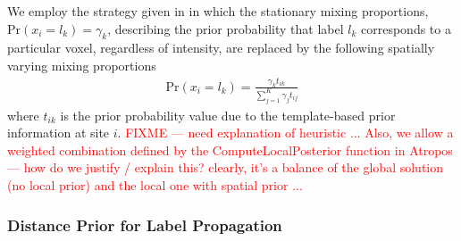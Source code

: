 \documentclass[11pt,english]{article}
\begin{document}
We employ the strategy given in \cite{Ashburner2005} in which the
stationary mixing proportions, $\mathrm{Pr}(x_i = l_k) = \gamma_k$,
describing the prior probability that label $l_k$ corresponds to a particular voxel, regardless of intensity, are replaced by the following spatially varying mixing proportions
\begin{align}
\mathrm{Pr}(x_i = l_k) = \frac{\gamma_k t_{ik}}{\sum_{j=1}^K\gamma_j t_{ij}}
\end{align}
where $t_{ik}$ is the prior probability value due to the
template-based prior information at site $i$.
{\textcolor{red}{FIXME --- need explanation of heuristic ...  Also, we
  allow a weighted combination defined by the ComputeLocalPosterior
  function in Atropos --- how do we justify / explain this?   clearly,
it's a balance of the global solution (no local prior) and the local
one with spatial prior ... }}

\subsubsection{Distance Prior for Label Propagation}
\end{document}
